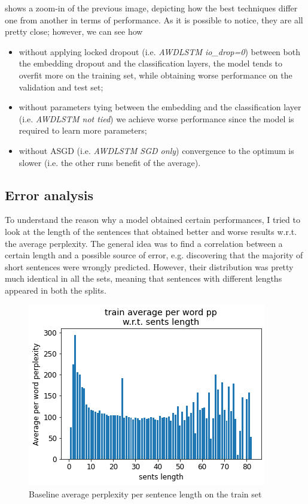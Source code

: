  shows a zoom-in of the previous image, depicting how the best techniques differ one from another in terms of performance. As it is possible to notice, they are all pretty close; however, we can see how
\begin{itemize}
\item without applying locked dropout (i.e. \textit{AWDLSTM io\_drop=0}) between both the embedding dropout and the classification layers, the model tends to overfit more on the training set, while obtaining worse performance on the validation and test set;
\item without parameters tying between the embedding and the classification layer (i.e. \textit{AWDLSTM not tied}) we achieve worse performance since the model is required to learn more parameters;
\item without ASGD (i.e. \textit{AWDLSTM SGD only}) convergence to the optimum is slower (i.e. the other runs benefit of the average).
\end{itemize}

\subsection{Error analysis}
To understand the reason why a model obtained certain performances, I tried to look at the length of the sentences that obtained better and worse results w.r.t. the average perplexity. The general idea was to find a correlation between a certain length and a possible source of error, e.g. discovering that the majority of short sentences were wrongly predicted. However, their distribution was pretty much identical in all the sets, meaning that sentences with different lengths appeared in both the splits.

\begin{figure}[!t]
    \centering
    \includegraphics[scale=0.40]{assets/baseline_train_pp_per_length.png}
    \vspace{-1.0em}
    \caption{Baseline average perplexity per sentence length on the train set}
    \vspace{-1.0em}
    \label{fig:baseline-train-pp}
\end{figure}

